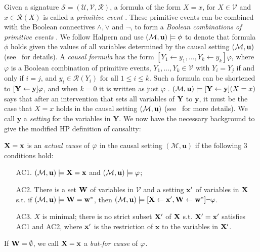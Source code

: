 Given a signature $\mathcal{S} = (\mathcal{U},\mathcal{V},\mathcal{R})$, a formula of the form $X=x$, for $X\in \mathcal{V}$ and $x\in\mathcal{R}(X)$ is called a \emph{primitive event} \cite{halpern2005causes,halpern2016actual}. These primitive events can be combined with the Boolean connectives $\wedge, \vee$ and $\neg$, to form a \emph{Boolean combinations of primitive events} \cite{halpern2005causes,halpern2016actual}. 
We follow Halpern and use $(\mathcal{M},\mathbf{u}) \models \phi$ to denote that formula $\phi$ holds given the values of all variables determined by the causal setting $(\mathcal{M},\mathbf{u})$ (see~\cite{halpern2016actual} for details).
A \emph{causal formula} has the form $[Y_1\leftarrow y_1, ... , Y_k \leftarrow y_k]\varphi$, where $\varphi$ is a Boolean combination of primitive events, $Y_1,...,Y_k \in \mathcal{V}$ with
$Y_i = Y_j$ if and only if $i = j$, and $y_i\in\mathcal{R}(Y_i) \text{ for all } 1 \leq i \leq k$. Such a formula can be shortened to $[\mathbf{Y}\leftarrow\mathbf{y}]\varphi$, and when $k=0$ it is written as just $\varphi$ \cite{halpern2005causes}.
$(\mathcal{M},\mathbf{u}) \models [\mathbf{Y}\leftarrow\mathbf{y}](X = x)$ says that after an intervention that sets all variables of $\mathbf{Y}$ to $\mathbf{y}$, it must be the case that $X = x$ holds in the causal setting $(\mathcal{M},\mathbf{u})$ (see~\cite{halpern2005causes,halpern2016actual} for more details).
We call $\mathbf{y}$ a \emph{setting} for the variables in $\mathbf{Y}$.
We now have the necessary background to give the modified HP definition of causality:
\begin{definition}\label{def:HP}
$\mathbf{X} = \mathbf{x}$ is an \emph{actual cause} of $\varphi$ in the causal setting $(\mathcal{M},\mathbf{u})$ if the following 3 conditions hold:
\begin{itemize}
    \item[\textnormal{AC1.}]  $(\mathcal{M},\mathbf{u})\models \mathbf{X} = \mathbf{x}$ and $(\mathcal{M},\mathbf{u})\models \varphi$;
    \item[\textnormal{AC2.}] There is a set $\mathbf{W}$ of variables in $\mathcal{V}$ and a setting $\mathbf{x}'$ of variables in $\mathbf{X}$ s.t. if $(\mathcal{M},\mathbf{u})\models \mathbf{W} = \mathbf{w}^\ast$, then $(\mathcal{M},\mathbf{u}) \models [\mathbf{X} \leftarrow \mathbf{x}', \mathbf{W} \leftarrow \mathbf{w}^\ast] \neg \varphi$.
    \item[\textnormal{AC3.}] $X$ is minimal; there is no strict subset $\mathbf{X}'$ of $\mathbf{X}$ s.t. $\mathbf{X}' = \mathbf{x}'$ satisfies \textnormal{AC1} and \textnormal{AC2}, where $\mathbf{x}'$ is the restriction of $\mathbf{x}$ to the variables in $\mathbf{X}'$.
\end{itemize}
\end{definition}
If $\mathbf{W} = \emptyset$, we call $\mathbf{X} = \mathbf{x}$ a \emph{but-for cause} of $\varphi$.

